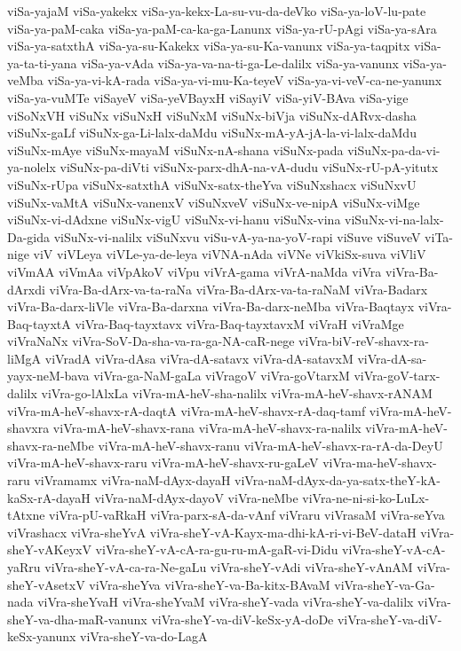 {viSa-yajaM
viSa-yakekx
viSa-ya-kekx-La-su-vu-da-deVko
viSa-ya-loV-lu-pate
viSa-ya-paM-caka
viSa-ya-paM-ca-ka-ga-Lanunx
viSa-ya-rU-pAgi
viSa-ya-sAra
viSa-ya-satxthA
viSa-ya-su-Kakekx
viSa-ya-su-Ka-vanunx
viSa-ya-taqpitx
viSa-ya-ta-ti-yana
viSa-ya-vAda
viSa-ya-va-na-ti-ga-Le-dalilx
viSa-ya-vanunx
viSa-ya-veMba
viSa-ya-vi-kA-rada
viSa-ya-vi-mu-Ka-teyeV
viSa-ya-vi-veV-ca-ne-yanunx
viSa-ya-vuMTe
viSayeV
viSa-yeVBayxH
viSayiV
viSa-yiV-BAva
viSa-yige
viSoNxVH
viSuNx
viSuNxH
viSuNxM
viSuNx-biVja
viSuNx-dARvx-dasha
viSuNx-gaLf
viSuNx-ga-Li-lalx-daMdu
viSuNx-mA-yA-jA-la-vi-lalx-daMdu
viSuNx-mAye
viSuNx-mayaM
viSuNx-nA-shana
viSuNx-pada
viSuNx-pa-da-vi-ya-nolelx
viSuNx-pa-diVti
viSuNx-parx-dhA-na-vA-dudu
viSuNx-rU-pA-yitutx
viSuNx-rUpa
viSuNx-satxthA
viSuNx-satx-theYva
viSuNxshacx
viSuNxvU
viSuNx-vaMtA
viSuNx-vanenxV
viSuNxveV
viSuNx-ve-nipA
viSuNx-viMge
viSuNx-vi-dAdxne
viSuNx-vigU
viSuNx-vi-hanu
viSuNx-vina
viSuNx-vi-na-lalx-Da-gida
viSuNx-vi-nalilx
viSuNxvu
viSu-vA-ya-na-yoV-rapi
viSuve
viSuveV
viTa-nige
viV
viVLeya
viVLe-ya-de-leya
viVNA-nAda
viVNe
viVkiSx-suva
viVliV
viVmAA
viVmAa
viVpAkoV
viVpu
viVrA-gama
viVrA-naMda
viVra
viVra-Ba-dArxdi
viVra-Ba-dArx-va-ta-raNa
viVra-Ba-dArx-va-ta-raNaM
viVra-Badarx
viVra-Ba-darx-liVle
viVra-Ba-darxna
viVra-Ba-darx-neMba
viVra-Baqtayx
viVra-Baq-tayxtA
viVra-Baq-tayxtavx
viVra-Baq-tayxtavxM
viVraH
viVraMge
viVraNaNx
viVra-SoV-Da-sha-va-ra-ga-NA-caR-nege
viVra-biV-reV-shavx-ra-liMgA
viVradA
viVra-dAsa
viVra-dA-satavx
viVra-dA-satavxM
viVra-dA-sa-yayx-neM-bava
viVra-ga-NaM-gaLa
viVragoV
viVra-goVtarxM
viVra-goV-tarx-dalilx
viVra-go-lAlxLa
viVra-mA-heV-sha-nalilx
viVra-mA-heV-shavx-rANAM
viVra-mA-heV-shavx-rA-daqtA
viVra-mA-heV-shavx-rA-daq-tamf
viVra-mA-heV-shavxra
viVra-mA-heV-shavx-rana
viVra-mA-heV-shavx-ra-nalilx
viVra-mA-heV-shavx-ra-neMbe
viVra-mA-heV-shavx-ranu
viVra-mA-heV-shavx-ra-rA-da-DeyU
viVra-mA-heV-shavx-raru
viVra-mA-heV-shavx-ru-gaLeV
viVra-ma-heV-shavx-raru
viVramamx
viVra-naM-dAyx-dayaH
viVra-naM-dAyx-da-ya-satx-theY-kA-kaSx-rA-dayaH
viVra-naM-dAyx-dayoV
viVra-neMbe
viVra-ne-ni-si-ko-LuLx-tAtxne
viVra-pU-vaRkaH
viVra-parx-sA-da-vAnf
viVraru
viVrasaM
viVra-seYva
viVrashacx
viVra-sheYvA
viVra-sheY-vA-Kayx-ma-dhi-kA-ri-vi-BeV-dataH
viVra-sheY-vAKeyxV
viVra-sheY-vA-cA-ra-gu-ru-mA-gaR-vi-Didu
viVra-sheY-vA-cA-yaRru
viVra-sheY-vA-ca-ra-Ne-gaLu
viVra-sheY-vAdi
viVra-sheY-vAnAM
viVra-sheY-vAsetxV
viVra-sheYva
viVra-sheY-va-Ba-kitx-BAvaM
viVra-sheY-va-Ga-nada
viVra-sheYvaH
viVra-sheYvaM
viVra-sheY-vada
viVra-sheY-va-dalilx
viVra-sheY-va-dha-maR-vanunx
viVra-sheY-va-diV-keSx-yA-doDe
viVra-sheY-va-diV-keSx-yanunx
viVra-sheY-va-do-LagA
}
